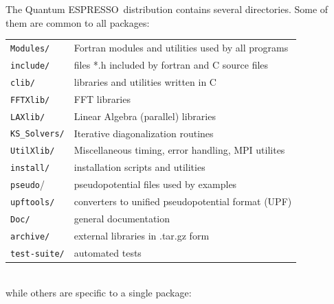 \documentclass[12pt,a4paper]{article}
\def\qe{{\sc Quantum ESPRESSO}}
\begin{document}



The \qe\ distribution contains several directories. Some of them are
common to all packages:

\begin{tabular}{ll}
\texttt{Modules/} &  Fortran modules and utilities used by all programs\\
\texttt{include/} &  files *.h included by fortran and C source files\\
\texttt{clib/}    &  libraries and utilities written in C\\
\texttt{FFTXlib/} &  FFT libraries\\
\texttt{LAXlib/}  &  Linear Algebra (parallel) libraries\\
\texttt{KS\_Solvers/}  &  Iterative diagonalization routines\\
\texttt{UtilXlib/}&  Miscellaneous timing, error handling, MPI utilites\\
\texttt{install/} &  installation scripts and utilities\\
\texttt{pseudo}/  &  pseudopotential files used by examples\\
\texttt{upftools/}&  converters to unified pseudopotential format (UPF)\\
\texttt{Doc/}     &  general documentation\\
\texttt{archive/} &  external libraries in .tar.gz form\\
\texttt{test-suite/} &  automated tests\\
\end{tabular}
\\
while others are specific to a single package:
\end{document}
